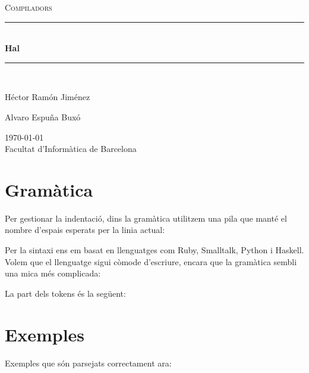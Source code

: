\documentclass[a4paper,11pt]{article}
\newcommand{\assignatura}{Compiladors}
\newcommand{\titol}{Hal}
\newcommand{\Pautor}{Héctor Ramón Jiménez}
\newcommand{\Sautor}{Alvaro Espuña Buxó}
\newcommand{\HRule}{\rule{\linewidth}{0.5mm}}
\begin{document}
\begin{titlepage}
  \begin{center}
    \textsc{\Large \assignatura}\\[0.5cm]
    \HRule \\[0.4cm]
     { \huge \bfseries \titol \\[0.4cm] }
    \HRule \\[0.8cm]
    \begin{minipage}{0.4\textwidth}
      \begin{flushleft}
        \large \Pautor
      \end{flushleft}
    \end{minipage}
    \begin{minipage}{0.4\textwidth}
      \begin{flushright}
        \large \Sautor
      \end{flushright}
    \end{minipage}

    \vfill
    {\large \today} \\[0.3cm]
    {\large Facultat d'Informàtica de Barcelona}
  \end{center}
\end{titlepage}
\newpage\null\thispagestyle{empty}\newpage

\section{Gramàtica}

Per gestionar la indentació, dins la gramàtica utilitzem una
pila que manté el nombre d'espais esperats per la linia actual:



\noindent Per la sintaxi ens em basat en llenguatges com Ruby, Smalltalk, Python
i Haskell. Volem que el llenguatge sigui còmode d'escriure, encara que
la gramàtica sembli una mica més complicada:



\noindent La part dels tokens és la següent:



\section{Exemples}
Exemples que són parsejats correctament ara:
\end{document}
